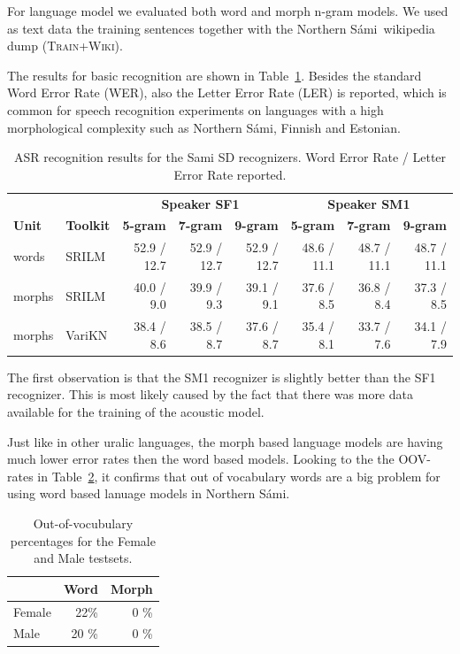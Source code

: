 \documentclass[b5paper]{article}
\newcommand{\ns}{Northern Sámi}
\newcommand{\ds}[1]{\textsc{#1}}
\begin{document}
For language model we evaluated both word and morph n-gram models. We used as text data the training sentences together with the \ns\ wikipedia dump (\ds{Train+Wiki}).

The results for basic recognition are shown in Table~\ref{tbl:samibasic}. Besides the standard Word Error Rate (WER), also the Letter Error Rate (LER) is reported, which is common for speech recognition experiments on languages with a high morphological complexity such as \ns, Finnish and Estonian.

\begin{table}[!h]
\centering
\begin{tabular}{ll|rrr|rrr}
& & \multicolumn{3}{|c|}{\textbf{Speaker SF1}} & \multicolumn{3}{|c}{\textbf{Speaker SM1}} \\
 \textbf{Unit} & \textbf{Toolkit} & \textbf{5-gram} & \textbf{7-gram} & \textbf{9-gram} & \textbf{5-gram} & \textbf{7-gram} & \textbf{9-gram}\\\hline
 words & SRILM & 52.9 / 12.7 & 52.9 / 12.7& 52.9 / 12.7&48.6 / 11.1 & 48.7 / 11.1 & 48.7 / 11.1\\
morphs & SRILM & 40.0 /  9.0 & 39.9 / 9.3& 39.1 / 9.1 & 37.6 / 8.5 & 36.8 / 8.4 & 37.3 / 8.5 \\
 morphs & VariKN  & 38.4 / 8.6& 38.5 / 8.7  & 37.6 / 8.7 & 35.4 / 8.1 &  33.7 / 7.6 & 34.1 / 7.9 \\

\end{tabular}
\caption{ASR recognition results for the Sami SD recognizers. Word Error Rate / Letter Error Rate reported.\label{tbl:samibasic}}
\end{table}


The first observation is that the SM1 recognizer is slightly better than the SF1 recognizer. This is most likely caused by the fact that there was more data available for the training of the acoustic model.

Just like in other uralic languages, the morph based language models are having much lower error rates then the word based models. Looking to the  the OOV-rates in Table~\ref{tbl:samioov}, it confirms that out of vocabulary words are a big problem for using word based lanuage models in \ns.

\begin{table}[!h]
\centering
\begin{tabular}{lrr}
& Word & Morph\\\hline
Female &  22\% & 0 \% \\
Male & 20 \% & 0 \%\\
\end{tabular}
\caption{Out-of-vocubulary percentages for the Female and Male testsets. \label{tbl:samioov}}
\end{table}
\end{document}
